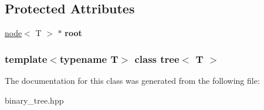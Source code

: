 \subsection*{\-Protected \-Attributes}
\begin{DoxyCompactItemize}
\item 
\hypertarget{classtree_ad55ca9242c09941eaa797a677755c37d}{\hyperlink{structnode}{node}$<$ \-T $>$ $\ast$ {\bfseries root}}\label{classtree_ad55ca9242c09941eaa797a677755c37d}

\end{DoxyCompactItemize}
\subsubsection*{template$<$typename T$>$ class tree$<$ T $>$}



\-The documentation for this class was generated from the following file\-:\begin{DoxyCompactItemize}
\item 
binary\-\_\-tree.\-hpp\end{DoxyCompactItemize}
